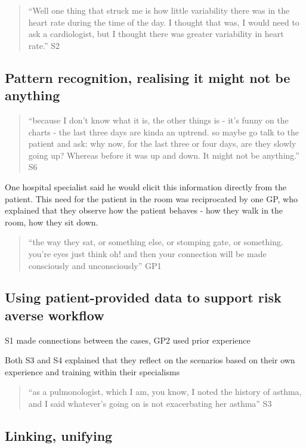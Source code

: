 \documentclass{sigchi}
\begin{document}
\begin{quote}
    ``Well one thing that struck me is how little variability there was in the heart rate during the time of the day. I thought that was, I would need to ask a cardiologist, but I thought there was greater variability in heart rate.'' S2
\end{quote}


\subsection{Pattern recognition, realising it might not be anything}

\begin{quote}
    ``because I don't know what it is, the other things is - it's funny on the charts - the last three days are kinda an uptrend. so maybe go talk to the patient and ask: why now, for the last three or four days, are they slowly going up? Whereas before it was up and down. It might not be anything.'' S6
\end{quote}

One hospital specialist said he would elicit this information directly from the patient. This need for the patient in the room was reciprocated by one GP, who explained that they observe how the patient behaves - how they walk in the room, how they sit down. 

\begin{quote}
    ``the way they sat, or something else, or stomping gate, or something. you're eyes just think oh! and then your connection will be made consciously and unconsciously'' GP1
\end{quote}


\subsection{Using patient-provided data to support risk averse workflow}

S1 made connections between the cases, GP2 used prior experience

Both S3 and S4 explained that they reflect on the scenarios based on their own experience and training within their specialisms

\begin{quote}
    ``as a pulmonologist, which I am, you know, I noted the history of asthma, and I said whatever's going on is not exacerbating her asthma'' S3
\end{quote}


\subsection{Linking, unifying}
\end{document}

